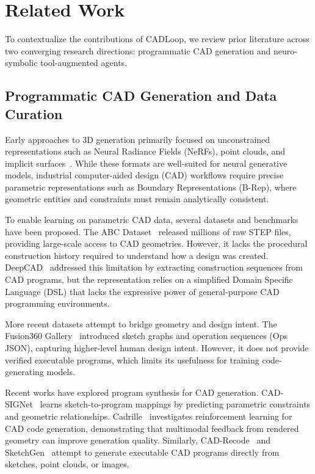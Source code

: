 \section{Related Work}
\label{sec:related}

To contextualize the contributions of CADLoop, we review prior literature across
two converging research directions: programmatic CAD generation and
neuro-symbolic tool-augmented agents.

\subsection{Programmatic CAD Generation and Data Curation}

Early approaches to 3D generation primarily focused on unconstrained
representations such as Neural Radiance Fields (NeRFs), point clouds,
and implicit surfaces~\cite{mildenhall2020nerf,nichol2022improved}.
While these formats are well-suited for neural generative models,
industrial computer-aided design (CAD) workflows require precise
parametric representations such as Boundary Representations (B-Rep),
where geometric entities and constraints must remain analytically
consistent.

To enable learning on parametric CAD data, several datasets and
benchmarks have been proposed. The ABC Dataset~\cite{koch2019abc}
released millions of raw STEP files, providing large-scale access to
CAD geometries. However, it lacks the procedural construction history
required to understand how a design was created.
DeepCAD~\cite{wu2021deepcad} addressed this limitation by extracting
construction sequences from CAD programs, but the representation relies
on a simplified Domain Specific Language (DSL) that lacks the expressive
power of general-purpose CAD programming environments.

More recent datasets attempt to bridge geometry and design intent.
The Fusion360 Gallery~\cite{willis2021sketch} introduced sketch graphs
and operation sequences (Ops JSON), capturing higher-level human design
intent. However, it does not provide verified executable programs,
which limits its usefulness for training code-generating models.

Recent works have explored program synthesis for CAD generation.
CAD-SIGNet~\cite{khan2024cadsignet} learns sketch-to-program mappings by
predicting parametric constraints and geometric relationships.
Cadrille~\cite{kolodiazhnyi2025cadrille} investigates reinforcement
learning for CAD code generation, demonstrating that multimodal
feedback from rendered geometry can improve generation quality.
Similarly, CAD-Recode~\cite{rukhovich2024cadrecode} and
SketchGen~\cite{wang2024sketch} attempt to generate executable CAD
programs directly from sketches, point clouds, or images.

